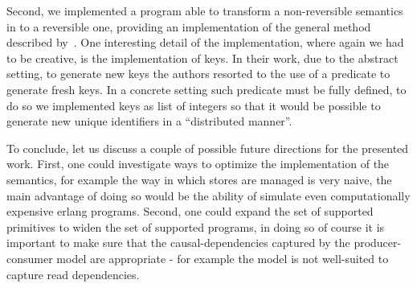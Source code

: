 \documentclass{article}[12pt,a4paper]
\theoremstyle{definition}
\begin{document}
Second, we implemented a program able to transform a non-reversible semantics in to a
reversible one, providing an implementation of the general method described
by~\cite{LaneseM20}. One interesting detail of the implementation, where again we had to be
creative, is the implementation of keys. In their work, due to the abstract
setting, to generate new keys the authors resorted to the use of a predicate
to generate fresh keys. In a concrete setting such predicate must be fully
defined, to do so we implemented keys as list of integers so that it would be
possible to generate new unique identifiers in a ``distributed manner''.

To conclude, let us discuss a couple of possible future directions for the presented
work. First, one could investigate ways to optimize the implementation of the
semantics, for example the way in which stores are managed is very naive,
the main advantage of doing so would be the ability of simulate even
computationally expensive erlang
programs. Second, one could expand the set of supported primitives to widen the
set of supported programs, in doing so of course it is important to make sure
that the causal-dependencies captured by the producer-consumer model are
appropriate - for example the model is not well-suited to capture read
dependencies.


  





\end{document}
